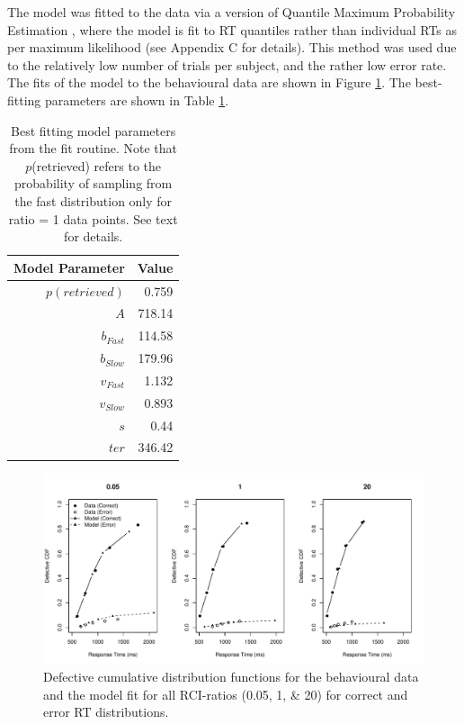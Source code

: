 \documentclass[a4paper, jou, natbib]{apa6}
\begin{document}
The model was fitted to the data via a version of Quantile Maximum Probability Estimation \citep[QMPE][]{Heathcote2002}, where the model is fit to RT quantiles rather than individual RTs as per maximum likelihood (see Appendix C for details). This method was used due to the relatively low number of trials per subject, and the rather low error rate. The fits of the model to the behavioural data are shown in Figure \ref{fig:modelFit}. The best-fitting parameters are shown in Table \ref{tab:bestParameters}. 

\begin{table}[htbp]
  \centering
  \caption{Best fitting model parameters from the fit routine. Note that $p$(retrieved) refers to the probability of sampling from the fast distribution only for ratio = 1 data points. See text for details.}
    \begin{tabular}{rr}
    \toprule
    Model Parameter & Value \\
    \midrule
    $p(retrieved)$     & 0.759 \\
    $A$     & 718.14 \\
    $b_{Fast}$ & 114.58 \\
    $b_{Slow}$ & 179.96 \\
    $v_{Fast}$ & 1.132 \\
    $v_{Slow}$ & 0.893 \\
    $s$     & 0.44 \\
    $ter$   & 346.42 \\
    \bottomrule
    \end{tabular}%
  \label{tab:bestParameters}%
\end{table}%


\begin{figure}
\begin{center}
\includegraphics[width = \textwidth]{Images/qmp2RCI_drift_+_b.pdf}
\caption{Defective cumulative distribution functions for the behavioural data and the model fit for all RCI-ratios (0.05, 1, \& 20) for correct and error RT distributions.}
\label{fig:modelFit}
\end{center}
\end{figure}
\end{document}
